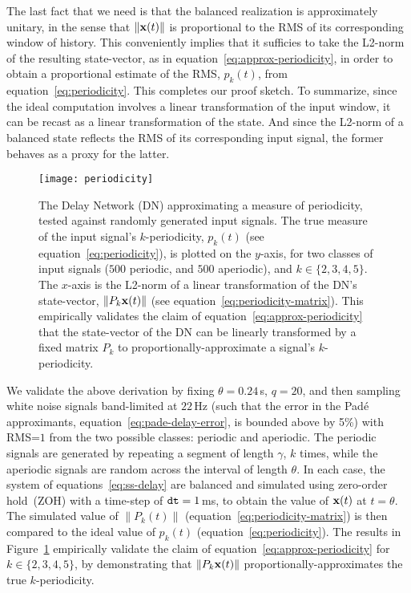 The last fact that we need is that the balanced realization is approximately unitary, in the sense that $\| \mathbf{x}(t) \|$ is proportional to the RMS of its corresponding window of history.
This conveniently implies that it sufficies to take the L2-norm of the resulting state-vector, as in equation~\ref{eq:approx-periodicity}, in order to obtain a proportional estimate of the RMS, $p_k(t)$, from equation~\ref{eq:periodicity}.
This completes our proof sketch.
To summarize, since the ideal computation involves a linear transformation of the input window, it can be recast as a linear transformation of the state.
And since the L2-norm of a balanced state reflects the RMS of its corresponding input signal, the former behaves as a proxy for the latter.

\begin{figure}
  \centering
  \texttt{[image: periodicity]}
  \caption{\label{fig:periodicity}
    The Delay Network (DN) approximating a measure of periodicity, tested against  randomly generated input signals.
    The true measure of the input signal's $k$-periodicity, $p_k(t)$ (see equation~\ref{eq:periodicity}), is plotted on the $y$-axis, for two classes of input signals ($500$ periodic, and $500$ aperiodic), and $k \in \{2, 3, 4, 5\}$.
    The $x$-axis is the L2-norm of a linear transformation of the DN's state-vector, $\| P_k \mathbf{x}(t) \|$ (see equation~\ref{eq:periodicity-matrix}).
    This empirically validates the claim of equation~\ref{eq:approx-periodicity} that the state-vector of the DN can be linearly transformed by a fixed matrix $P_k$ to proportionally-approximate a signal's $k$-periodicity.
  }
\end{figure}

We validate the above derivation by fixing $\theta=0.24$\,s, $q=20$, and then sampling white noise signals band-limited at $22$\,Hz (such that the error in the Pad\'e approximants, equation~\ref{eq:pade-delay-error}, is bounded above by 5\%) with RMS=$1$ from the two possible classes: periodic and aperiodic.
The periodic signals are generated by repeating a segment of length $\gamma$, $k$ times, while the aperiodic signals are random across the interval of length $\theta$.
In each case, the system of equations~\ref{eq:ss-delay} are balanced and simulated using zero-order hold~(ZOH) with a time-step of $\texttt{dt}{} = 1$\,ms, to obtain the value of $\mathbf{x}(t)$ at $t = \theta$.
The simulated value of $\| P_k(t) \|$ (equation~\ref{eq:periodicity-matrix}) is then compared to the ideal value of $p_k(t)$ (equation~\ref{eq:periodicity}).
The results in Figure~\ref{fig:periodicity} empirically validate the claim of equation~\ref{eq:approx-periodicity} for $k \in \{2, 3, 4, 5\}$, by demonstrating that $\|P_k \mathbf{x}(t) \|$ proportionally-approximates the true $k$-periodicity.

